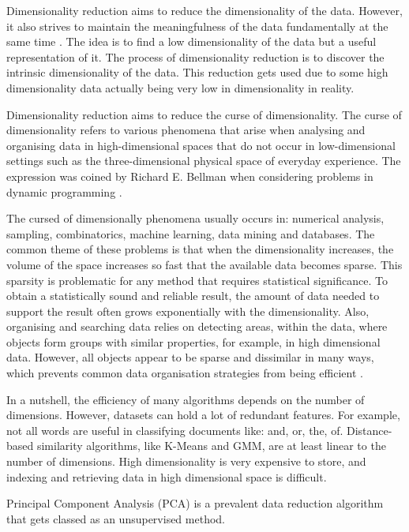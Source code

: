 		Dimensionality reduction aims to reduce the dimensionality of the data. However, it also strives to maintain the meaningfulness of the data fundamentally at the same time \cite{bishop2006pattern}. The idea is to find a low dimensionality of the data but a useful representation of it. The process of dimensionality reduction is to discover the intrinsic dimensionality of the data. This reduction gets used due to some high dimensionality data actually being very low in dimensionality in reality.
		
		Dimensionality reduction aims to reduce the curse of dimensionality. The curse of dimensionality refers to various phenomena that arise when analysing and organising data in high-dimensional spaces that do not occur in low-dimensional settings such as the three-dimensional physical space of everyday experience. The expression was coined by Richard E. Bellman when considering problems in dynamic programming \cite{bishop2006pattern}.
		
		The cursed of dimensionally phenomena usually occurs in: numerical analysis, sampling, combinatorics, machine learning, data mining and databases. The common theme of these problems is that when the dimensionality increases, the volume of the space increases so fast that the available data becomes sparse. This sparsity is problematic for any method that requires statistical significance. To obtain a statistically sound and reliable result, the amount of data needed to support the result often grows exponentially with the dimensionality. Also, organising and searching data relies on detecting areas, within the data, where objects form groups with similar properties, for example, in high dimensional data. However, all objects appear to be sparse and dissimilar in many ways, which prevents common data organisation strategies from being efficient \cite{geron2019hands}.
		
		In a nutshell, the efficiency of many algorithms depends on the number of dimensions. However, datasets can hold a lot of redundant features. For example, not all words are useful in classifying documents like: and, or, the, of. Distance-based similarity algorithms, like K-Means and GMM, are at least linear to the number of dimensions. High dimensionality is very expensive to store, and indexing and retrieving data in high dimensional space is difficult.
	
		Principal Component Analysis (PCA) is a prevalent data reduction algorithm that gets classed as an unsupervised method. 
		
